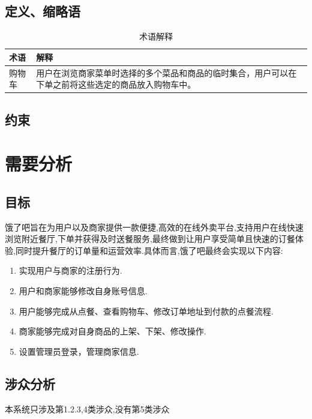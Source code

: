 \subsection{ 定义、缩略语}


\begin{table}[h]
    \centering
    \begin{tabularx}{0.8\linewidth}{|l|X|}
    \hline
        \textbf{术语} & \textbf{解释}\\ \hline
        购物车 &用户在浏览商家菜单时选择的多个菜品和商品的临时集合，用户可以在下单之前将这些选定的商品放入购物车中。  \\
    \hline
    \end{tabularx}
    \caption{术语解释}
    \label{tab:sy}
\end{table}

\subsection{约束}

\section{需要分析}

\subsection{目标}
饿了吧旨在为用户以及商家提供一款便捷,高效的在线外卖平台,支持用户在线快速浏览附近餐厅,下单并获得及时送餐服务,最终做到让用户享受简单且快速的订餐体验,同时提升餐厅的订单量和运营效率.具体而言,饿了吧最终会实现以下内容:
  \begin{enumerate}
      \item  实现用户与商家的注册行为.
      \item  用户和商家能够修改自身账号信息.
      \item  用户能够完成从点餐、查看购物车、修改订单地址到付款的点餐流程.
      \item  商家能够完成对自身商品的上架、下架、修改操作.
      \item  设置管理员登录，管理商家信息.
  \end{enumerate}

\subsection{涉众分析}
本系统只涉及第1.2.3,4类涉众,没有第5类涉众


